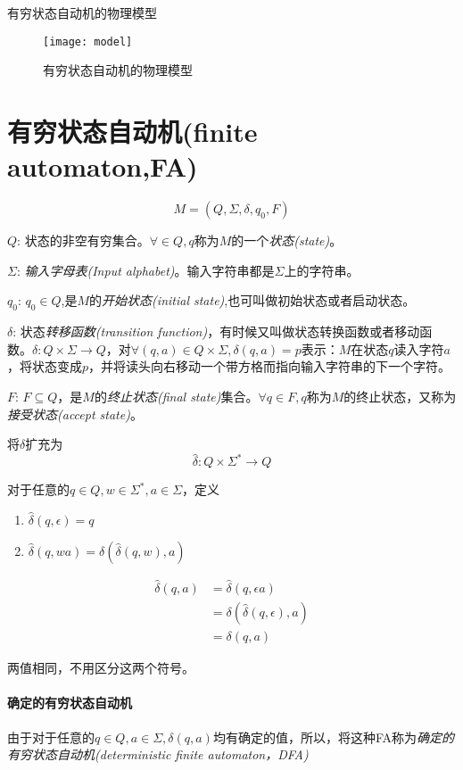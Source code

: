 有穷状态自动机的物理模型
\begin{figure}[htbp]
	\texttt{[image: model]}
	\caption{有穷状态自动机的物理模型}
	\label{fig:model}       %
\end{figure}

\section{有穷状态自动机(finite automaton,FA)}
\[M=(Q,\Sigma,\delta,q_0,F)\]

$Q$: 状态的非空有穷集合。$\forall\in Q,q$称为$M$的一个\emph{状态(state)}。

$\Sigma$: \emph{输入字母表(Input alphabet)}。输入字符串都是$\Sigma$上的字符串。

$q_0$: $q_0\in Q$,是$M$的\emph{开始状态(initial state)},也可叫做初始状态或者启动状态。

$\delta$: 状态\emph{转移函数(transition function)}，有时候又叫做状态转换函数或者移动函数。$\delta: Q\times\Sigma\to Q$，对$\forall(q,a)\in Q\times\Sigma,\delta(q,a)=p$表示：$M$在状态$q$读入字符$a$，将状态变成$p$，并将读头向右移动一个带方格而指向输入字符串的下一个字符。

$F$: $F\subseteq Q$，是$M$的\emph{终止状态(final state)}集合。$\forall q\in F, q$称为$M$的终止状态，又称为\emph{接受状态(accept state)}。  

将$\delta$扩充为
\[\hat{\delta}: Q\times\Sigma^{\ast}\to Q\]

对于任意的$q\in Q, w\in\Sigma^{\ast}, a\in\Sigma$，定义
\begin{enumerate}
	\item $\hat{\delta}(q,\epsilon) = q$
	\item $\hat{\delta}(q,wa) = \delta(\hat{\delta}(q,w),a)$
\end{enumerate}
\begin{align*}
 \hat{\delta}(q,a) &= \hat{\delta}(q,\epsilon a) \\
 				   &= \delta(\hat{\delta}(q,\epsilon),a) \\
 				   &= \delta(q,a)
\end{align*}

两值相同，不用区分这两个符号。 

\paragraph{\textbf{确定的有穷状态自动机}}

由于对于任意的$q\in Q, a\in\Sigma, \delta(q,a)$均有确定的值，所以，将这种FA称为\emph{确定的有穷状态自动机(deterministic finite automaton，DFA) }

